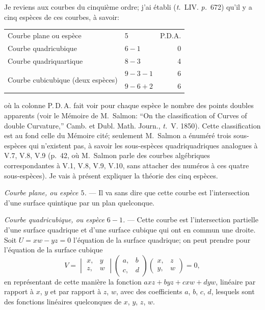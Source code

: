\documentclass[11pt,a4paper]{article}
\newcommand{\tome}{\textit{t.}}
\newcommand{\page}{\textit{p.}}
\begin{document}
Je reviens aux courbes du cinqui\`{e}me ordre; j'ai \'{e}tabli (\tome~LIV. \page~672) qu'il y a cinq esp\`{e}ces de ces courbes, \`{a} savoir:

\begin{center}
\begin{tabular}{l@{\quad}l@{\quad}r}
Courbe plane ou esp\`{e}ce & 5 & P.D.A. \\
Courbe quadricubique & $6 - 1$ & 0 \\
Courbe quadriquartique & $8 - 3$ & 4 \\
\multirow{2}{*}{Courbe cubicubique (deux esp\`{e}ces)} & $9 - 3 - 1$ & 6 \\
 & $9 - 6 + 2$ & 6 \\
\end{tabular}
\end{center}

\noindent o\`{u} la colonne P.\,D.\,A. fait voir pour chaque esp\`{e}ce le nombre des points doubles apparents (voir le M\'{e}moire de M.~Salmon: ``On the classification of Curves of double Curvature,'' Camb. et Dubl. Math. Journ., \tome~V. 1850). Cette classification est au fond celle du M\'{e}moire cit\'{e}; seulement M.~Salmon a \'{e}num\'{e}r\'{e} trois sous-esp\`{e}ces qui n'existent pas, \`{a} savoir les sous-esp\`{e}ces quadriquadriques analogues \`{a} V.7, V.8, V.9 (p.~42, o\`{u} M.~Salmon parle des courbes alg\'{e}briques correspondantes \`{a} V.1, V.8, V.9, V.10, sans attacher des num\'{e}ros \`{a} ces quatre sous-esp\`{e}ces). Je vais \`{a} pr\'{e}sent expliquer la th\'{e}orie des cinq esp\`{e}ces.

\medskip
\noindent\textit{Courbe plane, ou esp\`{e}ce $5$.} --- Il va sans dire que cette courbe est l'intersection d'une surface quintique par un plan quelconque.

\medskip
\noindent\textit{Courbe quadricubique, ou esp\`{e}ce $6 - 1$.} --- Cette courbe est l'intersection partielle d'une surface quadrique et d'une surface cubique qui ont en commun une droite. Soit $U = xw - yz = 0$ l'\'{e}quation de la surface quadrique; on peut prendre pour l'\'{e}quation de la surface cubique
\[
V = \begin{vmatrix} x, & y \\ z, & w \end{vmatrix} \begin{pmatrix} a, & b \\ c, & d \end{pmatrix} \begin{pmatrix} x, & z \\ y, & w \end{pmatrix} = 0,
\]
en repr\'{e}sentant de cette mani\`{e}re la fonction $axz + byz + cxw + dyw$, lin\'{e}aire par rapport \`{a} $x$, $y$ et par rapport \`{a} $z$, $w$, avec des coefficients $a$, $b$, $c$, $d$, lesquels sont des fonctions lin\'{e}aires quelconques de $x$, $y$, $z$, $w$.
\end{document}
